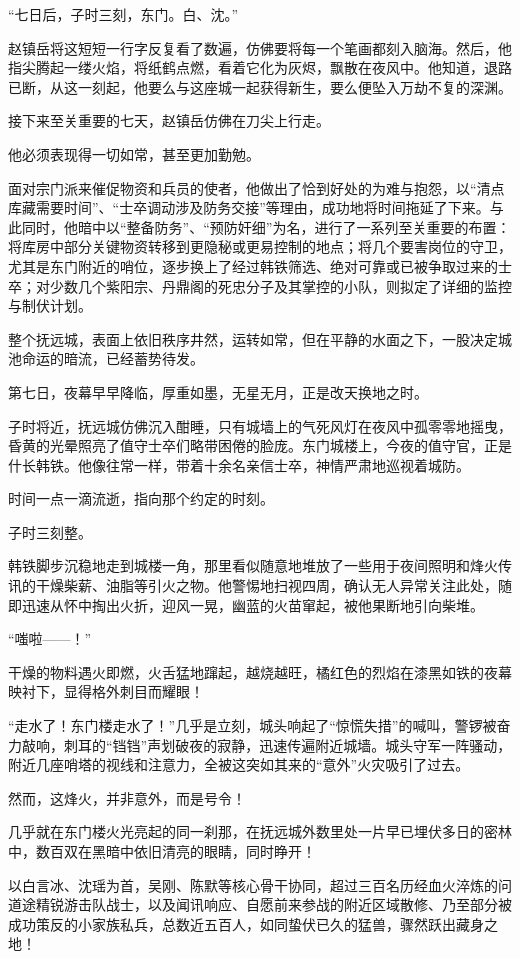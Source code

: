 “七日后，子时三刻，东门。白、沈。”

赵镇岳将这短短一行字反复看了数遍，仿佛要将每一个笔画都刻入脑海。然后，他指尖腾起一缕火焰，将纸鹤点燃，看着它化为灰烬，飘散在夜风中。他知道，退路已断，从这一刻起，他要么与这座城一起获得新生，要么便坠入万劫不复的深渊。

接下来至关重要的七天，赵镇岳仿佛在刀尖上行走。

他必须表现得一切如常，甚至更加勤勉。

面对宗门派来催促物资和兵员的使者，他做出了恰到好处的为难与抱怨，以“清点库藏需要时间”、“士卒调动涉及防务交接”等理由，成功地将时间拖延了下来。与此同时，他暗中以“整备防务”、“预防奸细”为名，进行了一系列至关重要的布置：将库房中部分关键物资转移到更隐秘或更易控制的地点；将几个要害岗位的守卫，尤其是东门附近的哨位，逐步换上了经过韩铁筛选、绝对可靠或已被争取过来的士卒；对少数几个紫阳宗、丹鼎阁的死忠分子及其掌控的小队，则拟定了详细的监控与制伏计划。

整个抚远城，表面上依旧秩序井然，运转如常，但在平静的水面之下，一股决定城池命运的暗流，已经蓄势待发。

第七日，夜幕早早降临，厚重如墨，无星无月，正是改天换地之时。

子时将近，抚远城仿佛沉入酣睡，只有城墙上的气死风灯在夜风中孤零零地摇曳，昏黄的光晕照亮了值守士卒们略带困倦的脸庞。东门城楼上，今夜的值守官，正是什长韩铁。他像往常一样，带着十余名亲信士卒，神情严肃地巡视着城防。

时间一点一滴流逝，指向那个约定的时刻。

子时三刻整。

韩铁脚步沉稳地走到城楼一角，那里看似随意地堆放了一些用于夜间照明和烽火传讯的干燥柴薪、油脂等引火之物。他警惕地扫视四周，确认无人异常关注此处，随即迅速从怀中掏出火折，迎风一晃，幽蓝的火苗窜起，被他果断地引向柴堆。

“嗤啦——！”

干燥的物料遇火即燃，火舌猛地蹿起，越烧越旺，橘红色的烈焰在漆黑如铁的夜幕映衬下，显得格外刺目而耀眼！

“走水了！东门楼走水了！”几乎是立刻，城头响起了“惊慌失措”的喊叫，警锣被奋力敲响，刺耳的“铛铛”声划破夜的寂静，迅速传遍附近城墙。城头守军一阵骚动，附近几座哨塔的视线和注意力，全被这突如其来的“意外”火灾吸引了过去。

然而，这烽火，并非意外，而是号令！

几乎就在东门楼火光亮起的同一刹那，在抚远城外数里处一片早已埋伏多日的密林中，数百双在黑暗中依旧清亮的眼睛，同时睁开！

以白言冰、沈瑶为首，吴刚、陈默等核心骨干协同，超过三百名历经血火淬炼的问道途精锐游击队战士，以及闻讯响应、自愿前来参战的附近区域散修、乃至部分被成功策反的小家族私兵，总数近五百人，如同蛰伏已久的猛兽，骤然跃出藏身之地！


